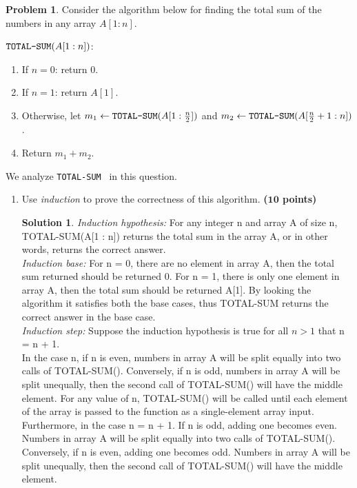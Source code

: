 \documentclass{article}
\theoremstyle{definition}
\newtheorem{problem}{Problem}
\newtheorem*{solution*}{Solution}
\newenvironment{solution}{\begin{solution*}}{{} \end{solution*}}
\newcommand{\grade}[1]{\hfill{\textbf{($\mathbf{#1}$ points)}}}
\newcommand{\totalsum}{\textnormal{\texttt{TOTAL-SUM}}}
\begin{document}
\begin{problem}\label{induction}
	Consider the algorithm below for finding the total sum of the numbers in any array $A[1:n]$.  
	
	\medskip
	
	$\totalsum (A[1:n])$: \vspace{-0.4cm}
	\medskip
	\begin{enumerate}
		\item If $n=0$: return $0$. 
		\item If $n=1$: return $A[1]$.
		\item Otherwise, let $m_1 \leftarrow \totalsum(A[1:\frac n2])$ and $m_2 \leftarrow \totalsum(A[\frac n2+1:n])$. 
		\item Return  $m_1 + m_2$. 
	\end{enumerate}
	We analyze \totalsum~ in this question. 
	\begin{enumerate}[label=(\alph*)]
		\item Use \emph{induction} to prove the correctness of this algorithm. \grade{10}

\bigskip
	\begin{solution}
	
	\emph{Induction hypothesis:} For any integer n and array A of size n, TOTAL-SUM(A[1 : n]) returns the total sum in the array A, or in other words, returns the correct answer. \\
	
	\emph{Induction base:} For n = 0, there are no element in array A, then the total sum returned should be returned 0. For n = 1, there is only one element in array A, then the total sum should be returned A[1]. By looking the 			algorithm it satisfies both the base cases, thus TOTAL-SUM returns the correct answer in the base case. \\
	
	\emph{Induction step:} Suppose the induction hypothesis is true for all $n > 1$ that n = n + 1. \\
	
	In the case n, if n is even, numbers in array A will be split equally into two calls of TOTAL-SUM(). Conversely, if n is odd, numbers in array A will be split unequally, then the second call of TOTAL-SUM() will have the middle element. 	For any value of n, TOTAL-SUM() will be called until each element of the array is passed to the function as a single-element array input. \\
	
	Furthermore, in the case n = n + 1. If n is odd, adding one becomes even. Numbers in array A will be split equally into two calls of TOTAL-SUM(). Conversely, if n is even, adding one becomes odd. Numbers in array A will be split 	unequally, then the second call of TOTAL-SUM() will have the middle element. \\
	

\end{solution}
\end{enumerate}
\end{problem}
\end{document}
